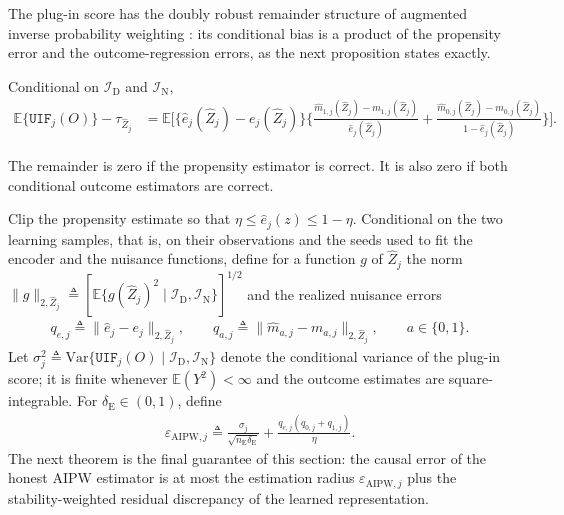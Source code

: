 The plug-in score has the doubly robust remainder structure of augmented inverse probability weighting \citep{chernozhukov2017double,kennedy2022semiparametric}: its conditional bias is a product of the propensity error and the outcome-regression errors, as the next proposition states exactly.
\begin{proposition}
\label{prop:aipw-remainder}
\normalfont
Conditional on $\mathcal I_{\mathrm D}$ and $\mathcal I_{\mathrm N}$,
\begin{align}\label{eq:aipw-remainder}
	\mathbb E\{\mathtt{UIF}_j(O)\}-\tau_{\widehat Z_j} &=
	\mathbb E
	\Bigg[
	\{\widehat e_j(\widehat Z_j)-e_j(\widehat Z_j)\}
	\Bigg\{
	\frac{\widehat m_{1,j}(\widehat Z_j)-m_{1,j}(\widehat Z_j)}
	{\widehat e_j(\widehat Z_j)} +
	\frac{\widehat m_{0,j}(\widehat Z_j)-m_{0,j}(\widehat Z_j)}
	{1-\widehat e_j(\widehat Z_j)}
	\Bigg\}
	\Bigg].
\end{align}
\end{proposition}

The remainder is zero if the propensity estimator is correct. It is also zero if both conditional outcome estimators are correct.

Clip the propensity estimate so that $\eta\le\widehat e_j(z)\le1-\eta$. Conditional on the two learning samples, that is, on their observations and the seeds used to fit the encoder and the nuisance functions, define for a function $g$ of $\widehat Z_j$ the norm $\|g\|_{2,\widehat Z_j}\triangleq[\mathbb E\{g(\widehat Z_j)^2\mid\mathcal I_{\mathrm D},\mathcal I_{\mathrm N}\}]^{1/2}$ and the realized nuisance errors
\begin{align}
q_{e,j}\triangleq\|\widehat e_j-e_j\|_{2,\widehat Z_j},
\qquad
q_{a,j}\triangleq\|\widehat m_{a,j}-m_{a,j}\|_{2,\widehat Z_j},
\qquad a\in\{0,1\}.
\label{eq:realized-nuisance-errors}
\end{align}
Let $\sigma_j^2\triangleq\mathrm{Var}\{\mathtt{UIF}_j(O)\mid\mathcal I_{\mathrm D},\mathcal I_{\mathrm N}\}$ denote the conditional variance of the plug-in score; it is finite whenever $\mathbb E(Y^2)<\infty$ and the outcome estimates are square-integrable. For $\delta_{\mathrm E}\in(0,1)$, define
\begin{align}
\varepsilon_{\mathrm{AIPW},j}
\triangleq
\frac{\sigma_j}{\sqrt{n_{\mathrm E}\delta_{\mathrm E}}}
+
\frac{q_{e,j}(q_{0,j}+q_{1,j})}{\eta}.
\label{eq:aipw-error-radius}
\end{align}
The next theorem is the final guarantee of this section: the causal error of the honest AIPW estimator is at most the estimation radius $\varepsilon_{\mathrm{AIPW},j}$ plus the stability-weighted residual discrepancy of the learned representation.

